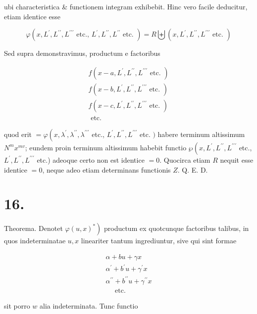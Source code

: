 \documentclass[10pt]{article}
\begin{document}
ubi characteristica \& functionem integram exhibebit. Hinc vero facile deducitur, etiam identice esse

\[
\varphi\left(x, L^{\prime}, L^{\prime \prime}, L^{\prime \prime \prime} \text { etc., } L^{\prime}, L^{\prime \prime}, L^{\prime \prime} \text { etc. }\right)=R \biguplus\left(x, L^{\prime}, L^{\prime \prime}, L^{\prime \prime \prime} \text { etc. }\right)
\]

Sed supra demonstravimus, productum e factoribus

\[
\begin{gathered}
f\left(x-a, L^{\prime}, L^{\prime \prime}, L^{\prime \prime \prime} \text { etc. }\right) \\
f\left(x-b, L^{\prime}, L^{\prime \prime}, L^{\prime \prime \prime} \text { etc. }\right) \\
f\left(x-c, L^{\prime}, L^{\prime \prime}, L^{\prime \prime \prime} \text { etc. }\right) \\
\text { etc. }
\end{gathered}
\]

quod erit \(=\varphi\left(x, \lambda^{\prime}, \lambda^{\prime \prime}, \lambda^{\prime \prime \prime}\right.\) etc., \(L^{\prime}, L^{\prime \prime}, L^{\prime \prime \prime}\) etc. \()\) habere terminum altissimum \(N^{m} x^{m v}\); eundem proin terminum altissimum habebit functio \(\wp\left(x, L^{\prime}, L^{\prime \prime}, L^{\prime \prime \prime}\right.\) etc., \(L^{\prime}, L^{\prime \prime}, L^{\prime \prime \prime}\) etc.) adeoque certo non est identice \(=0\). Quocirca etiam \(R\) nequit esse identice \(=0\), neque adeo etiam determinans functionis \(Z\). Q. E. D.

\section*{16.}
Theorema. Denotet \(\left.\varphi(u, x)^{*}\right)\) productum ex quotcunque factoribus talibus, in quos indeterminatae \(u, x\) lineariter tantum ingrediuntur, sive qui sint formae

\[
\begin{gathered}
\alpha+b u+\gamma x \\
\alpha^{\prime}+b^{\prime} u+\gamma^{\prime} x \\
\alpha^{\prime \prime}+b^{\prime \prime} u+\gamma^{\prime \prime} x \\
\quad \text { etc. }
\end{gathered}
\]

sit porro \(w\) alia indeterminata. Tunc functio
\end{document}
